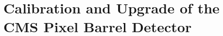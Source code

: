 \documentclass[a4paper, 11pt, twoside, openany]{ThesisStyle}
\begin{document}
			
	
	

	
	
	

	
	
	

	
	
\part{Calibration and Upgrade of the CMS Pixel Barrel Detector}

	
	
\end{document}
